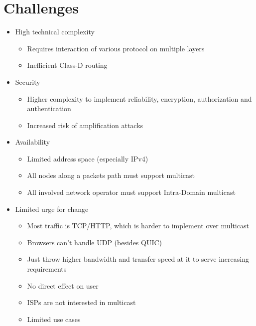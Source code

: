 \section{Challenges} %
\label{sec:Challenges}
\begin{itemize}\itemsep0em
    \item High technical complexity
    \begin{itemize}\itemsep0em
        \item Requires interaction of various protocol on multiple layers
        \item Inefficient Class-D routing
    \end{itemize}
    \item Security
    \begin{itemize}\itemsep0em
        \item Higher complexity to implement reliability, encryption, authorization and authentication
        \item Increased risk of amplification attacks
    \end{itemize}
    \item Availability
    \begin{itemize}\itemsep0em
        \item Limited address space (especially IPv4)
        \item All nodes along a packets path must support multicast
        \item All involved network operator must support Intra-Domain multicast
    \end{itemize}
    \item Limited urge for change
    \begin{itemize}
        \item Most traffic is TCP/HTTP, which is harder to implement over multicast
        \item Browsers can't handle UDP (besides QUIC)
        \item Just throw higher bandwidth and transfer speed at it to serve increasing requirements
        \item No direct effect on user
        \item ISPs are not interested in multicast
        \item Limited use cases
    \end{itemize}
\end{itemize}


